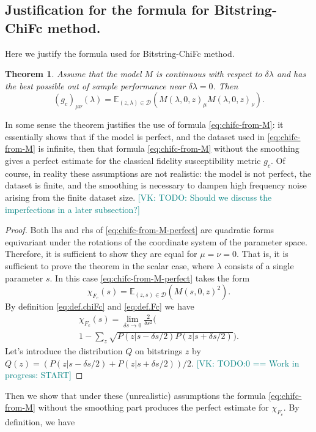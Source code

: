 \documentclass[american,aps,pra,reprint,floatfix,nofootinbib,superscriptaddress]{revtex4-2}
\newtheorem{theorem}{Theorem}
\newcommand{\VK}[1]{\textcolor{teal}{[VK: #1]}}
\begin{document}
\subsection{Justification for the formula for Bitstring-ChiFc method.}
Here we justify the formula used for Bitstring-ChiFc
method.
\begin{theorem}
    Assume that the model $M$ is continuous with respect to
    $\delta \lambda$ and
    has the best possible out of sample performance
    near $\delta \lambda = 0$.
    Then
    \begin{equation}
      \label{eq:chifc-from-M-perfect}
      \left(g_{c}\right)_{\mu\nu}(\lambda) =
        \mathbb{E}_{(z, \lambda) \in \mathcal{D}}
        \left(
          M(\lambda, 0, z)_{\mu}M(\lambda, 0, z)_{\nu}
        \right).
    \end{equation}
\end{theorem}
In some sense the theorem justifies the use of formula
\eqref{eq:chifc-from-M}: it essentially shows that if the model
is perfect, and the dataset used in \eqref{eq:chifc-from-M} is
infinite, then that formula \eqref{eq:chifc-from-M} without the
smoothing gives a perfect estimate for the classical fidelity
susceptibility metric $g_c$. Of course, in reality these assumptions are not realistic: the model is not perfect, the dataset is finite, and the smoothing is necessary to dampen high frequency noise arising from the finite dataset size.
\VK{TODO: Should we discuss the imperfections
in a later subsection?}
\begin{proof}
  Both lhs and rhs of \eqref{eq:chifc-from-M-perfect} are 
  quadratic forms equivariant under the rotations of the 
  coordinate system of the parameter space. Therefore,
  it is sufficient to show they are equal for $\mu = \nu = 0$.
  That is, it is sufficient to prove the theorem in the scalar 
  case, where $\lambda$ consists of a single parameter $s$.
  In this case \eqref{eq:chifc-from-M-perfect} takes the form
  \begin{equation}
      \label{eq:chifc-from-M-perfect-s}
      \chi_{F_c}(s) =
        \mathbb{E}_{(z, s) \in \mathcal{D}} \left(
        M(s, 0, z)^2\right).
  \end{equation}
  By definition \eqref{eq:def.chiFc} and \eqref{eq:def.Fc} we
  have
  \begin{multline}
    \chi_{F_c}(s) = \lim_{\delta s \to 0} \frac{2}{\delta s^2}
    \Biggl(\\
      1-\sum_{z} \sqrt{P(z|s - \delta s / 2) P(z|s+\delta s/2)}
    \Biggr).
  \end{multline}
  Let's introduce the distribution $Q$ on bitstrings $z$
  by $Q(z) = (P(z|s - \delta s / 2) + P(z|s+\delta s/2)) / 2$.
  \VK{TODO:0 == Work in progress: START}
\end{proof}
Then we show that under these (unrealistic) assumptions
the formula \eqref{eq:chifc-from-M}
without the smoothing part produces the perfect estimate for $\chi_{F_c}$.
By definition, we have
\end{document}
